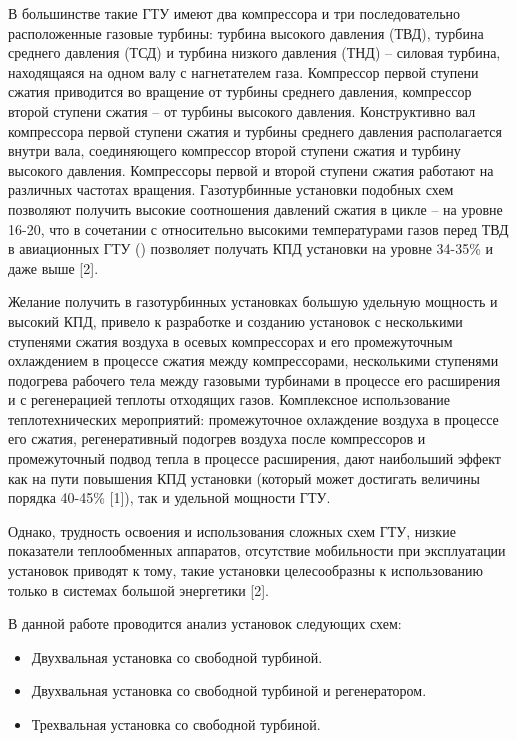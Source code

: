 В большинстве такие ГТУ имеют два компрессора и три последовательно расположенные газовые турбины: турбина высокого давления (ТВД), турбина среднего давления (ТСД) и турбина низкого давления (ТНД) – силовая турбина, находящаяся на одном валу с нагнетателем газа. Компрессор первой ступени сжатия приводится во вращение от турбины среднего  давления, компрессор второй ступени сжатия – от турбины высокого давления. Конструктивно вал компрессора первой ступени сжатия и турбины среднего давления   располагается внутри вала, соединяющего компрессор второй ступени сжатия и турбину высокого давления.  Компрессоры первой и второй ступени сжатия  работают на различных частотах вращения. Газотурбинные установки подобных схем позволяют получить высокие соотношения давлений сжатия в цикле – на уровне 16-20, что в сочетании с относительно высокими температурами газов перед ТВД в авиационных ГТУ () позволяет получать КПД установки на уровне 34-35\% и даже выше [2].

Желание получить в газотурбинных установках большую удельную мощность и высокий КПД, привело к разработке и созданию установок с несколькими ступенями сжатия воздуха в осевых компрессорах и его промежуточным охлаждением в процессе сжатия между компрессорами, несколькими ступенями подогрева рабочего тела между газовыми турбинами в процессе его расширения и с регенерацией теплоты отходящих газов. Комплексное использование теплотехнических мероприятий: промежуточное охлаждение воздуха в процессе его сжатия, регенеративный подогрев воздуха после компрессоров и промежуточный подвод тепла в процессе расширения, дают наибольший эффект как на пути повышения КПД установки (который может достигать величины порядка 40-45\% [1]), так  и удельной мощности ГТУ.

Однако, трудность освоения и использования сложных схем ГТУ,  низкие показатели теплообменных аппаратов,  отсутствие мобильности при эксплуатации установок приводят к тому, такие установки целесообразны к использованию только в системах большой энергетики [2].

В данной работе проводится анализ установок следующих схем:
\begin{itemize}
	\item Двухвальная установка со свободной турбиной.
	\item Двухвальная установка со свободной турбиной и регенератором.
	\item Трехвальная установка со свободной турбиной.
\end{itemize}

